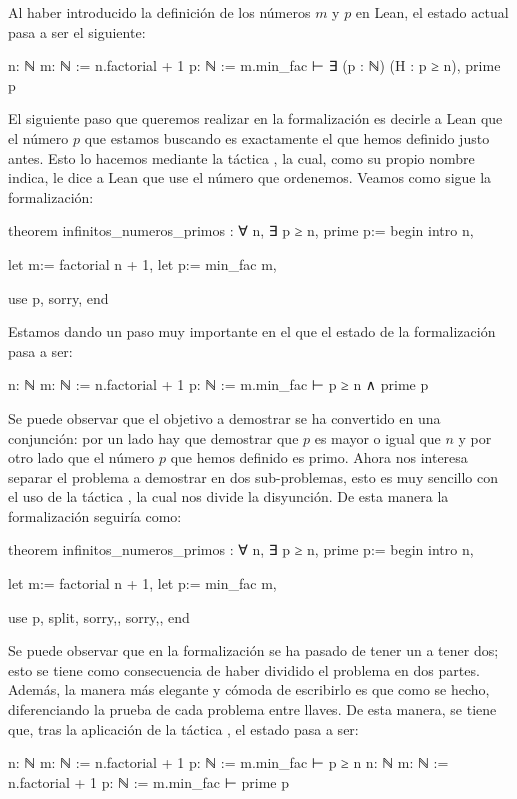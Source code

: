 Al haber introducido la definición de los números \(m\) y \(p\) en Lean, el
estado actual pasa a ser el siguiente:
\begin{leancode}
n: ℕ
m: ℕ := n.factorial + 1
p: ℕ := m.min_fac
⊢ ∃ (p : ℕ) (H : p ≥ n), prime p
\end{leancode}

El siguiente paso que queremos realizar en la formalización es decirle a Lean
que el número \(p\) que estamos buscando es exactamente el que hemos definido
justo antes. Esto lo hacemos mediante la táctica , la cual,
como su propio nombre indica, le dice a Lean que use el número que ordenemos.
Veamos como sigue la formalización:

\begin{leancode}
theorem infinitos_numeros_primos : ∀ n, ∃ p ≥ n, prime p:=
begin
  intro n,

  let m:= factorial n + 1,
  let p:= min_fac m,

  use p,
  sorry,
end
\end{leancode}

Estamos dando un paso muy importante en el que el estado de la formalización
pasa a ser:
\begin{leancode}
n: ℕ
m: ℕ := n.factorial + 1
p: ℕ := m.min_fac
⊢ p ≥ n ∧ prime p
\end{leancode}

Se puede observar que el objetivo a demostrar se ha convertido en una
conjunción: por un lado hay que demostrar que \(p\) es mayor o igual que
\(n\) y por otro lado que el número \(p\) que hemos definido es primo. Ahora
nos interesa separar el problema a demostrar en dos sub-problemas, esto es
muy sencillo con el uso de la táctica , la cual nos
divide la disyunción. De esta manera la formalización seguiría como:
\begin{leancode}
theorem infinitos_numeros_primos : ∀ n, ∃ p ≥ n, prime p:=
begin
  intro n,

  let m:= factorial n + 1,
  let p:= min_fac m,

  use p,
  split,
  {sorry,},
  {sorry,},
end
\end{leancode}

Se puede observar que en la formalización se ha pasado de tener un
 a tener dos; esto se tiene como consecuencia de haber
dividido el problema en dos partes. Además, la manera más elegante y cómoda
de escribirlo es que como se hecho, diferenciando la prueba de cada problema
entre llaves. De esta manera, se tiene que, tras la aplicación de la táctica
, el estado pasa a ser:
\begin{leancode}
n: ℕ
m: ℕ := n.factorial + 1
p: ℕ := m.min_fac
⊢ p ≥ n
n: ℕ
m: ℕ := n.factorial + 1
p: ℕ := m.min_fac
⊢ prime p
\end{leancode}

